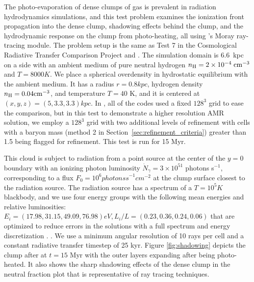 The photo-evaporation of dense clumps of gas is prevalent in radiation
hydrodynamics simulations, and this test problem examines the
ionization front propagation into the dense clump, shadowing effects
behind the clump, and the hydrodynamic response on the clump from
photo-heating, all using \enzo's Moray ray-tracing module.  The
problem setup is the same as Test 7 in the Cosmological Radiative
Transfer Comparison Project \citep{IlievEtAl2009} and
\citet{Wise11_Moray}.  The simulation domain is 6.6~kpc on a side with
an ambient medium of pure neutral hydrogen $n_{\rm H} = 2 \times
10^{-4}\; \cubecm$ and $T = 8000 \unit{K}$.  We place a spherical
overdensity in hydrostatic equilibrium with the ambient medium.  It
has a radius $r = 0.8 \unit{kpc}$, hydrogen density $n_{\rm H} = 0.04
\cubecm$, and temperature $T = 40$ K, and it is centered at $(x,y,z) =
(5, 3.3, 3.3) \unit{kpc}$.  In \citet{IlievEtAl2009}, all of the codes
used a fixed $128^3$ grid to ease the comparison, but in this test to
demonstrate a higher resolution AMR solution, we employ a $128^3$ grid
with two additional levels of refinement with cells with a baryon mass
(method 2 in Section~\ref{sec:refinement_criteria}) greater than 1.5
being flagged for refinement.  This test is run for 15 Myr.

This cloud is subject to radiation from a point source at the center
of the $y=0$ boundary with an ionizing photon luminosity
$\dot{N}_\gamma = 3 \times 10^{51}$ photons s$^{-1}$, corresponding to
a flux $F_0 = 10^6 \unit{photons s}^{-1} \unit{cm}^{-2}$ at the clump
surface closest to the radiation source.  The radiation source has a
spectrum of a $T = 10^5 \unit{K}$ blackbody, and we use four energy
groups with the following mean energies and relative luminosities:
$E_i = (17.98, 31.15, 49.09, 76.98) \unit{eV}, L_i/L = (0.23, 0.36,
0.24, 0.06)$ that are optimized to reduce errors in the solutions with
a full spectrum and energy discretization \citep{Mirocha12}.
\citep[Note that this choice of energy groups is different
from][]{Wise11_Moray}.  We use a minimum angular resolution of 10 rays
per cell and a constant radiative transfer timestep of 25 kyr.  Figure
\ref{fig:shadowing} depicts the clump after at $t = 15$ Myr with the
outer layers expanding after being photo-heated.  It also shows the
sharp shadowing effects of the dense clump in the neutral fraction
plot that is representative of ray tracing techniques.


